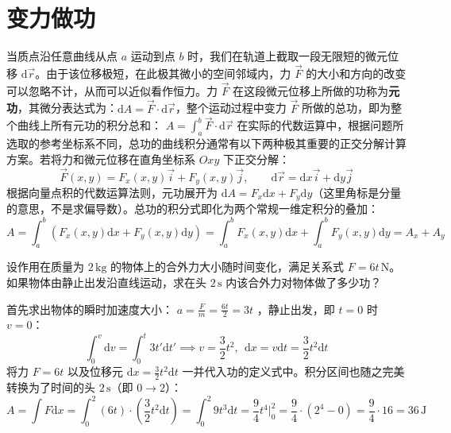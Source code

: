 \documentclass[lang=cn,11pt]{elegantbook}
\begin{document}
\section{变力做功}

当质点沿任意曲线从点 $a$ 运动到点 $b$ 时，我们在轨道上截取一段无限短的微元位移 $\mathrm{d}\vec{r}$。由于该位移极短，在此极其微小的空间邻域内，力 $\vec{F}$ 的大小和方向的改变可以忽略不计，从而可以近似看作恒力。力 $\vec{F}$ 在这段微元位移上所做的功称为\textbf{元功}，其微分表达式为：$\mathrm{d}A = \vec{F} \cdot \mathrm{d}\vec{r}$，整个运动过程中变力 $\vec{F}$ 所做的总功，即为整个曲线上所有元功的积分总和：
 \(A = \int_{a}^{b} \vec{F} \cdot \mathrm{d}\vec{r}\) 
在实际的代数运算中，根据问题所选取的参考坐标系不同，总功的曲线积分通常有以下两种极其重要的正交分解计算方案。若将力和微元位移在直角坐标系 $Oxy$ 下正交分解：
\[
\vec{F}(x, y) = F_x(x, y)\vec{i} + F_y(x, y)\vec{j}, \qquad \mathrm{d}\vec{r} = \mathrm{d}x\vec{i} + \mathrm{d}y\vec{j}
\]
根据向量点积的代数运算法则，元功展开为 $\mathrm{d}A = F_x\mathrm{d}x + F_y\mathrm{d}y$（这里角标是分量的意思，不是求偏导数）。总功的积分式即化为两个常规一维定积分的叠加：
\[
A = \int_{a}^{b} \left( F_x(x, y)\mathrm{d}x + F_y(x, y)\mathrm{d}y \right) = \int_{a}^{b} F_x(x, y)\mathrm{d}x + \int_{a}^{b} F_y(x, y)\mathrm{d}y = A_x + A_y
\]

\begin{exercise}
设作用在质量为 $2\,\text{kg}$ 的物体上的合外力大小随时间变化，满足关系式 $F = 6t\,\text{N}$。如果物体由静止出发沿直线运动，求在头 $2\,\text{s}$ 内该合外力对物体做了多少功？
\end{exercise}
\begin{solution}
首先求出物体的瞬时加速度大小： \(a = \frac{F}{m} = \frac{6t}{2} = 3t\) ，静止出发，即 $t=0$ 时 $v=0$：
$$\int_{0}^{v} \mathrm{d}v = \int_{0}^{t} 3t' \mathrm{d}t' \implies v = \frac{3}{2}t^2,~~\mathrm{d}x = v\mathrm{d}t = \frac{3}{2}t^2\mathrm{d}t$$将力 $F = 6t$ 以及位移元 $\mathrm{d}x = \frac{3}{2}t^2\mathrm{d}t$ 一并代入功的定义式中。积分区间也随之完美转换为了时间的头 $2\,\text{s}$（即 $0 \to 2$）：$$A = \int F \mathrm{d}x = \int_{0}^{2} (6t) \cdot \left(\frac{3}{2}t^2\mathrm{d}t\right)=\int_{0}^{2} 9t^3 \mathrm{d}t = \frac{9}{4}t^4 \Big|_0^2 = \frac{9}{4} \cdot (2^4 - 0) = \frac{9}{4} \cdot 16 = 36\,\text{J}$$
\end{solution}
\end{document}
